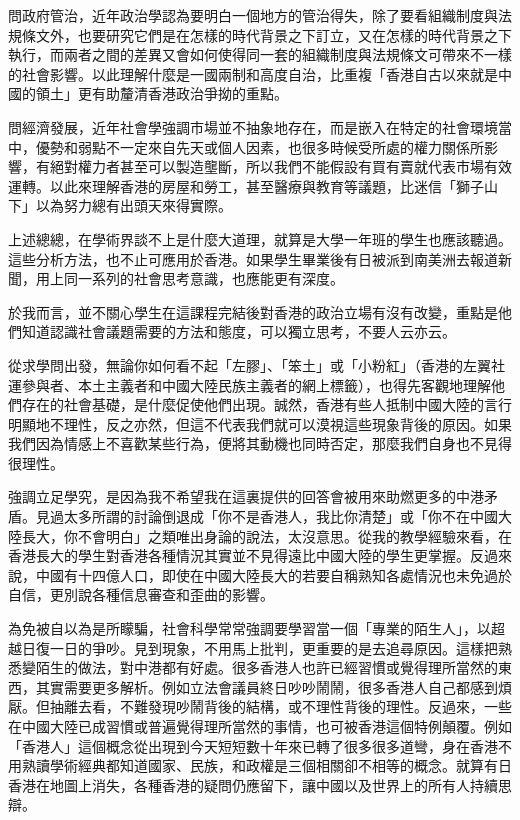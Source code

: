 問政府管治，近年政治學認為要明白一個地方的管治得失，除了要看組織制度與法規條文外，也要研究它們是在怎樣的時代背景之下訂立，又在怎樣的時代背景之下執行，而兩者之間的差異又會如何使得同一套的組織制度與法規條文可帶來不一樣的社會影響。以此理解什麼是一國兩制和高度自治，比重複「香港自古以來就是中國的領土」更有助釐清香港政治爭拗的重點。

問經濟發展，近年社會學強調市場並不抽象地存在，而是嵌入在特定的社會環境當中，優勢和弱點不一定來自先天或個人因素，也很多時候受所處的權力關係所影響，有絕對權力者甚至可以製造壟斷，所以我們不能假設有買有賣就代表市場有效運轉。以此來理解香港的房屋和勞工，甚至醫療與教育等議題，比迷信「獅子山下」以為努力總有出頭天來得實際。

上述總總，在學術界談不上是什麼大道理，就算是大學一年班的學生也應該聽過。這些分析方法，也不止可應用於香港。如果學生畢業後有日被派到南美洲去報道新聞，用上同一系列的社會思考意識，也應能更有深度。

於我而言，並不關心學生在這課程完結後對香港的政治立場有沒有改變，重點是他們知道認識社會議題需要的方法和態度，可以獨立思考，不要人云亦云。

從求學問出發，無論你如何看不起「左膠」、「笨土」或「小粉紅」（香港的左翼社運參與者、本土主義者和中國大陸民族主義者的網上標籤），也得先客觀地理解他們存在的社會基礎，是什麼促使他們出現。誠然，香港有些人抵制中國大陸的言行明顯地不理性，反之亦然，但這不代表我們就可以漠視這些現象背後的原因。如果我們因為情感上不喜歡某些行為，便將其動機也同時否定，那麼我們自身也不見得很理性。

強調立足學究，是因為我不希望我在這裏提供的回答會被用來助燃更多的中港矛盾。見過太多所謂的討論倒退成「你不是香港人，我比你清楚」或「你不在中國大陸長大，你不會明白」之類唯出身論的說法，太沒意思。從我的教學經驗來看，在香港長大的學生對香港各種情況其實並不見得遠比中國大陸的學生更掌握。反過來說，中國有十四億人口，即使在中國大陸長大的若要自稱熟知各處情況也未免過於自信，更別說各種信息審查和歪曲的影響。

為免被自以為是所矇騙，社會科學常常強調要學習當一個「專業的陌生人」，以超越日復一日的爭吵。見到現象，不用馬上批判，更重要的是去追尋原因。這樣把熟悉變陌生的做法，對中港都有好處。很多香港人也許已經習慣或覺得理所當然的東西，其實需要更多解析。例如立法會議員終日吵吵鬧鬧，很多香港人自己都感到煩厭。但抽離去看，不難發現吵鬧背後的結構，或不理性背後的理性。反過來，一些在中國大陸已成習慣或普遍覺得理所當然的事情，也可被香港這個特例顛覆。例如「香港人」這個概念從出現到今天短短數十年來已轉了很多很多道彎，身在香港不用熟讀學術經典都知道國家、民族，和政權是三個相關卻不相等的概念。就算有日香港在地圖上消失，各種香港的疑問仍應留下，讓中國以及世界上的所有人持續思辯。

